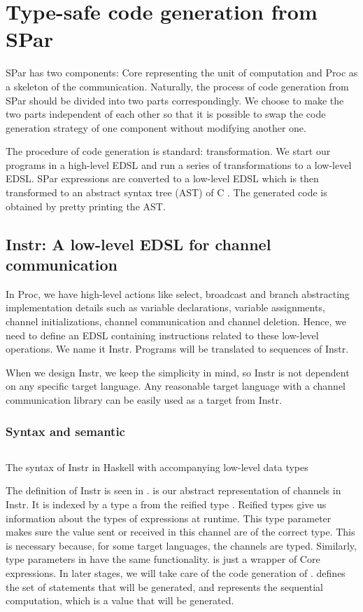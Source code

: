 \chapter{Type-safe code generation from SPar} \label{chap:cg}
SPar has two components: Core representing the unit of computation and Proc as a skeleton of the communication. Naturally, the process of code generation from SPar should be divided into two parts correspondingly. We choose to make the two parts independent of each other so that it is possible to swap the code generation strategy of one component without modifying another one.

The procedure of code generation is standard: transformation. We start our programs in a high-level EDSL and run a series of transformations to a low-level EDSL. SPar expressions are converted to a low-level EDSL which is then transformed to an abstract syntax tree (AST) of C \cite{LanguagecAnalysisGeneration}. The generated code is obtained by pretty printing the AST.
\section{Instr: A low-level EDSL for channel communication} \label{codegen:sec:instr}
In Proc, we have high-level actions like select, broadcast and branch abstracting implementation details such as variable declarations, variable assignments, channel initializations, channel communication and channel deletion. Hence, we need to define an EDSL containing instructions related to these low-level operations. We name it Instr. Programs will be translated to sequences of Instr. 

When we design Instr, we keep the simplicity in mind, so Instr is not dependent on any specific target language. Any reasonable target language with a channel communication library can be easily used as a target from Instr.

\subsection{Syntax and semantic}
\begin{listing}
    \inputminted{Haskell}{codegen/instr.hs} 
    \caption{The syntax of Instr in Haskell with accompanying low-level data types}
    \label{codegen:code:instr}
\end{listing}
The definition of Instr is seen in .  is our abstract representation of channels in Instr. It is indexed by a type a from the reified type . Reified types give us information about the types of expressions at runtime. This type parameter makes sure the value sent or received in this channel are of the correct type. This is necessary because, for some target languages, the channels are typed. Similarly, type parameters in  have the same functionality.  is just a wrapper of Core expressions. In later stages, we will take care of the code generation of .  defines the set of statements that will be generated, and  represents the sequential computation, which is a value that will be generated.

